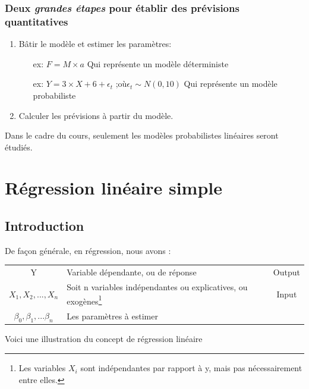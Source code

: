 \documentclass[11pt,french]{report}
\begin{document}
\subsection*{Deux \textit{grandes étapes} pour établir des prévisions quantitatives}
\begin{enumerate}
\item Bâtir le modèle et estimer les paramètres:
\begin{itemize}
\item[ex:] $F = M \times a$ Qui représente un modèle déterministe
\item[ex:] $Y =3 \times X + 6 + \epsilon_t \text{ ;où} \epsilon_t \sim N(0, 10)$ Qui représente un modèle probabiliste 
\end{itemize}
\item Calculer les prévisions à partir du modèle.
\end{enumerate}

\bigskip
Dans le cadre du cours, seulement les modèles probabilistes linéaires seront étudiés. 

\chapter{Régression linéaire simple}
\label{chap:2}
\section{Introduction}

De façon générale, en régression, nous avons :

\begin{tabularx}{\linewidth}{c|X|c}
\hline
Y & Variable dépendante, ou de réponse & Output \\
$X_1, X_2, ..., X_n$ & Soit n variables indépendantes ou explicatives, ou exogènes\footnote{Les variables $X_i$ sont indépendantes par rapport à y, mais pas nécessairement entre elles.} & Input \\
$\beta_0, \beta_1, ... \beta_n$ & Les paramètres à estimer & \\
\hline
\end{tabularx}

\bigskip
\bigskip
Voici une illustration du concept de régression linéaire
\end{document}
